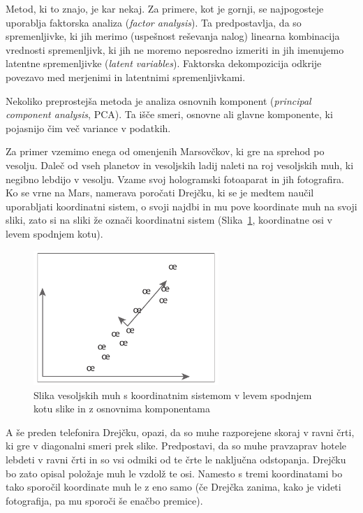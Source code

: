 Metod, ki to znajo, je kar nekaj. Za primere, kot je gornji, se najpogosteje uporablja faktorska analiza ({\em factor analysis}). Ta predpostavlja, da so spremenljivke, ki jih merimo (uspešnost reševanja nalog) linearna kombinacija vrednosti spremenljivk, ki jih ne moremo neposredno izmeriti in jih imenujemo latentne spremenljivke ({\em latent variables}). Faktorska dekompozicija odkrije povezavo med merjenimi in latentnimi spremenljivkami.

Nekoliko preprostejša metoda je analiza osnovnih komponent ({\em principal component analysis}, PCA). Ta išče smeri, osnovne ali glavne komponente, ki pojasnijo čim več variance v podatkih.

Za primer vzemimo enega od omenjenih Marsovčkov, ki gre na sprehod po vesolju. Daleč od vseh planetov in vesoljskih ladij naleti na roj vesoljskih muh, ki negibno lebdijo v vesolju. Vzame svoj hologramski fotoaparat in jih fotografira. Ko se vrne na Mars, namerava poročati Drejčku, ki se je medtem naučil uporabljati koordinatni sistem, o svoji najdbi in mu pove koordinate muh na svoji sliki, zato si na sliki že označi koordinatni sistem (Slika~\ref{f-muhe}, koordinatne osi v levem spodnjem kotu). 

\begin{figure}[tbp]
\begin{center}
\includegraphics[width=7cm]{slike/muhe.pdf}
\caption{Slika vesoljskih muh s koordinatnim sistemom v levem spodnjem kotu slike in z osnovnima komponentama}
\label{f-muhe}
\end{center}
\end{figure}

A še preden telefonira Drejčku, opazi, da so muhe razporejene skoraj v ravni črti, ki gre v diagonalni smeri prek slike. Predpostavi, da so muhe pravzaprav hotele lebdeti v ravni črti in so vsi odmiki od te črte le naključna odstopanja. Drejčku bo zato opisal položaje muh le vzdolž te osi. Namesto s tremi koordinatami bo tako sporočil koordinate muh le z eno samo (če Drejčka zanima, kako je videti fotografija, pa mu sporoči še enačbo premice).

